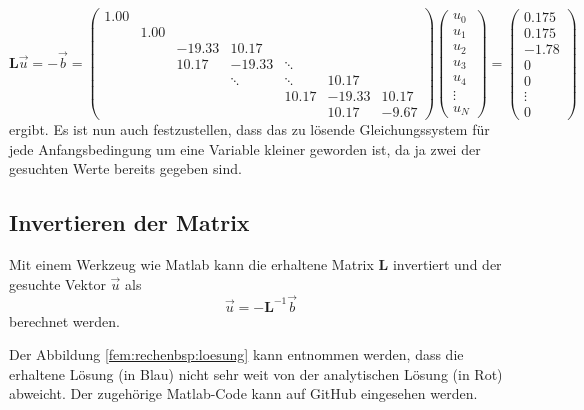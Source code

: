 \begin{equation}
    \mathbf{L}\vec{u} 
    = -\vec{b} 
    = \begin{pmatrix}
         1.00  &        &        &        &        &        &        \\
               &  1.00  &        &        &        &        &        \\
               &        &-19.33  & 10.17  &        &        &        \\
               &        & 10.17  &-19.33  & \ddots &        &        \\
               &        &        & \ddots & \ddots & 10.17  &        \\
               &        &        &        & 10.17  &-19.33  & 10.17  \\
               &        &        &        &        & 10.17  & -9.67  
    \end{pmatrix}
    \begin{pmatrix}
        u_0 \\ u_1 \\ u_2 \\ u_3 \\ u_4 \\ \vdots \\ u_N
    \end{pmatrix}
    =
    \begin{pmatrix}
        0.175 \\ 0.175 \\ -1.78 \\ 0 \\ 0 \\ \vdots \\ 0
    \end{pmatrix}
\end{equation}
ergibt.
Es ist nun auch festzustellen, dass das zu lösende Gleichungssystem für jede Anfangsbedingung um eine Variable kleiner geworden ist, da ja zwei der gesuchten Werte bereits gegeben sind.


\subsection{Invertieren der Matrix}
Mit einem Werkzeug wie Matlab kann die erhaltene Matrix $\mathbf{L}$ invertiert und der gesuchte Vektor $\vec{u}$ als 
\begin{equation}
    \vec{u} = - \mathbf{L}^{-1} \vec{b}
\end{equation}
berechnet werden.

Der Abbildung \ref{fem:rechenbsp:loesung} kann entnommen werden, dass die erhaltene Lösung (in Blau) nicht sehr weit von der analytischen Lösung (in Rot) abweicht.
Der zugehörige Matlab-Code kann auf GitHub \cite{fem:bib:matlab} eingesehen werden.